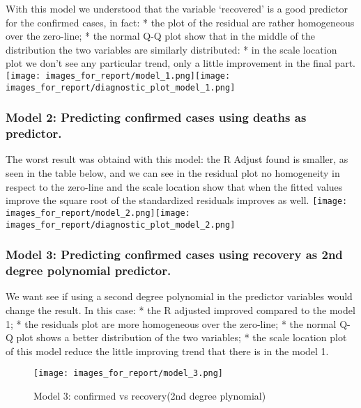 \documentclass[11pt]{article}
\makeatletter
\def\maxwidth{\ifdim\Gin@nat@width>\linewidth\linewidth
    \else\Gin@nat@width\fi}
\let\Oldincludegraphics\includegraphics
\renewcommand{\includegraphics}[1]{\Oldincludegraphics[width=.8\maxwidth]{#1}}
\makeatother
\begin{document}
With this model we understood that the variable `recovered' is a good
predictor for the confirmed cases, in fact: * the plot of the residual
are rather homogeneous over the zero-line; * the normal Q-Q plot show
that in the middle of the distribution the two variables are similarly
distributed: * in the scale location plot we don't see any particular
trend, only a little improvement in the final part.
\texttt{[image: images\_for\_report/model\_1.png]}\texttt{[image: images\_for\_report/diagnostic\_plot\_model\_1.png]}

\hypertarget{model-2-predicting-confirmed-cases-using-deaths-as-predictor.}{%
\subsubsection{Model 2: Predicting confirmed cases using deaths as
predictor.}\label{model-2-predicting-confirmed-cases-using-deaths-as-predictor.}}

The worst result was obtaind with this model: the R Adjust found is
smaller, as seen in the table below, and we can see in the residual plot
no homogeneity in respect to the zero-line and the scale location show
that when the fitted values improve the square root of the standardized
residuals improves as well.
\texttt{[image: images\_for\_report/model\_2.png]}\texttt{[image: images\_for\_report/diagnostic\_plot\_model\_2.png]}

\hypertarget{model-3-predicting-confirmed-cases-using-recovery-as-2nd-degree-polynomial-predictor.}{%
\subsubsection{Model 3: Predicting confirmed cases using recovery as 2nd
degree polynomial
predictor.}\label{model-3-predicting-confirmed-cases-using-recovery-as-2nd-degree-polynomial-predictor.}}

We want see if using a second degree polynomial in the predictor
variables would change the result. In this case: * the R adjusted
improved compared to the model 1; * the residuals plot are more
homogeneous over the zero-line; * the normal Q-Q plot shows a better
distribution of the two variables; * the scale location plot of this
model reduce the little improving trend that there is in the model 1.

\begin{figure}
\centering
\texttt{[image: images\_for\_report/model\_3.png]}
\caption{Model 3: confirmed vs recovery(2nd degree plynomial)}
\end{figure}
\end{document}
